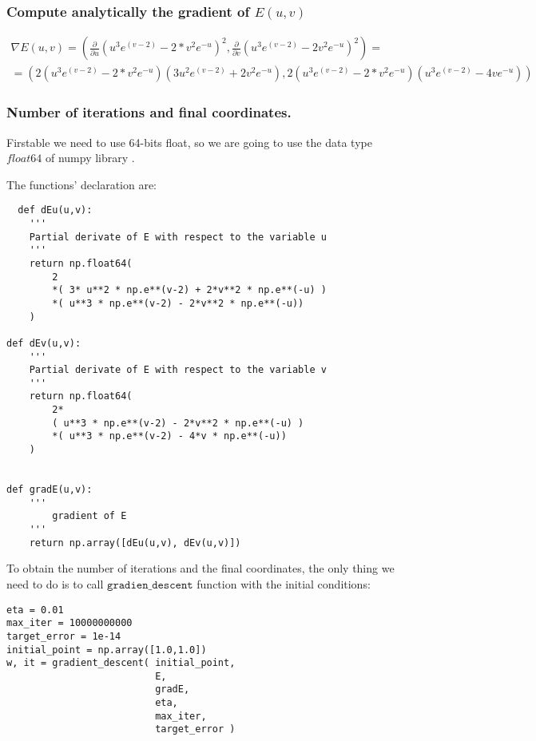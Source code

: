\subsubsection{Compute analytically the gradient of $E(u,v)$}


\begin{multline*}
  \nabla E(u,v) = \left( \frac{\partial}{\partial u}(u^3 e^{(v-2)} - 2* v^2 e^{-u})^2 , \frac{\partial}{\partial v} (u^3 e^{(v-2)} - 2 v^2 e^{-u})^2 \right) = \\
 =  \left(2(u^3 e^{(v-2)} - 2* v^2 e^{-u})(3u^2e^{(v-2)} + 2 v^2 e^{-u} ), 2(u^3 e^{(v-2)} - 2* v^2 e^{-u})(u^3 e^{(v-2)} - 4 v e^{-u}) \right)
\end{multline*}


\subsubsection{Number of iterations and final coordinates.}

Firstable we need to use 64-bits float, so we are going to use the data type $float64$ of numpy library \cite{float64}.

The functions' declaration are:

\begin{verbatim}
  def dEu(u,v):
    '''
    Partial derivate of E with respect to the variable u
    '''
    return np.float64(
        2
        *( 3* u**2 * np.e**(v-2) + 2*v**2 * np.e**(-u) )
        *( u**3 * np.e**(v-2) - 2*v**2 * np.e**(-u))
    )
    
def dEv(u,v):
    '''
    Partial derivate of E with respect to the variable v
    '''
    return np.float64(
        2*
        ( u**3 * np.e**(v-2) - 2*v**2 * np.e**(-u) )
        *( u**3 * np.e**(v-2) - 4*v * np.e**(-u))
    )


def gradE(u,v):
    ''' 
        gradient of E
    '''
    return np.array([dEu(u,v), dEv(u,v)])

\end{verbatim}

To obtain the number of iterations and the final coordinates, the only thing we need to do is to call $\texttt{gradien\_descent}$ function with the initial conditions:

\begin{verbatim}
eta = 0.01 
max_iter = 10000000000
target_error = 1e-14
initial_point = np.array([1.0,1.0])
w, it = gradient_descent( initial_point,
                          E,
                          gradE,
                          eta,
                          max_iter,
                          target_error )
\end{verbatim}

